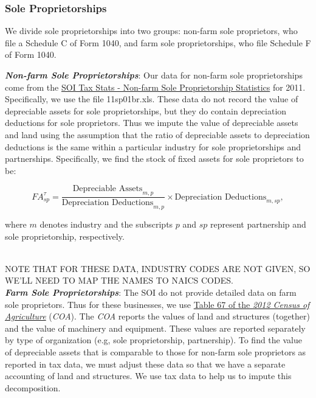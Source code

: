 \documentclass[article,11pt,letterpaper,fleqn]{article}
\theoremstyle{definition}
\numberwithin{equation}{section}
\begin{document}
\subsubsection{Sole Proprietorships}

We divide sole proprietorships into two groups: non-farm sole proprietors, who file a Schedule C of Form 1040, and farm sole proprietorships, who file Schedule F of Form 1040.  

\textbf{\emph{Non-farm Sole Proprietorships}}:  Our data for non-farm sole proprietorships come from the \href{http://www.irs.gov/uac/SOI-Tax-Stats-Nonfarm-Sole-Proprietorship-Statistics}{SOI Tax Stats - Non-farm Sole Proprietorship Statistics} for 2011.  Specifically, we use the file 11sp01br.xls.  These data do not record the value of depreciable assets for sole proprietorships, but they do contain depreciation deductions for sole proprietors.  Thus we impute the value of depreciable assets and land using the assumption that the ratio of depreciable assets to depreciation deductions is the same within a particular industry for sole proprietorships and partnerships.  Specifically, we find the stock of fixed assets for sole proprietors to be: 

\begin{equation}
{FA}^{\tau}_{sp}=\frac{\text{Depreciable Assets}_{m,p}}{\text{Depreciation Deductions}_{m,p}}\times \text{Depreciation Deductions}_{m,sp},
\end{equation}

\noindent\noindent where $m$ denotes industry and the subscripts $p$ and $sp$ represent partnership and sole proprietorship, respectively.  

\ \\
NOTE THAT FOR THESE DATA, INDUSTRY CODES ARE NOT GIVEN, SO WE'LL NEED TO MAP THE NAMES TO NAICS CODES.
\ \\

\textbf{\emph{Farm Sole Proprietorships}}:  The SOI do not provide detailed data on farm sole proprietors.  Thus for these businesses, we use \href{http://www.agcensus.usda.gov/Publications/2012/Full_Report/Volume_1,_Chapter_1_US/st99_1_067_067.pdf}{Table 67 of the \emph{2012 Census of Agriculture}} (\emph{COA}).  The \emph{COA} reports the values of land and structures (together) and the value of machinery and equipment.  These values are reported separately by type of organization (e.g, sole proprietorship, partnership).  To find the value of depreciable assets that is comparable to those for non-farm sole proprietors as reported in tax data, we must adjust these data so that we have a separate accounting of land and structures.  We use tax data to help us to impute this decomposition.  
\end{document}
